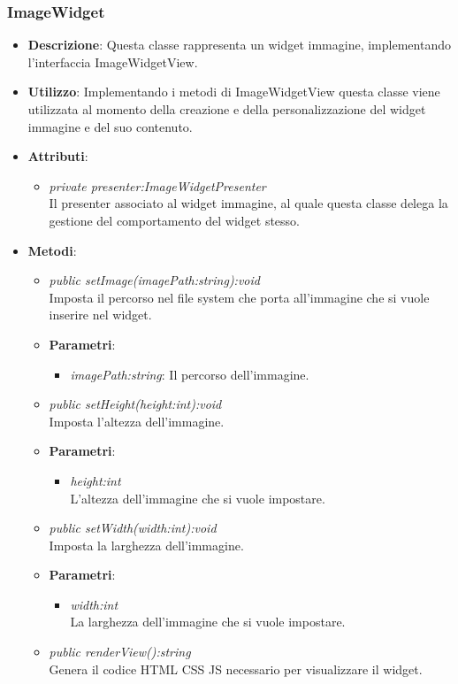 \subsubsection{ImageWidget}
\begin{itemize}
\item \textbf{Descrizione}: Questa classe rappresenta un widget immagine, implementando l'interfaccia ImageWidgetView.
\item \textbf{Utilizzo}: Implementando i metodi di ImageWidgetView questa classe viene utilizzata al momento della creazione e della personalizzazione del widget immagine e del suo contenuto.
\item \textbf{Attributi}:
	\begin{itemize}
	\item \textit{private presenter:ImageWidgetPresenter}\\
	Il presenter associato al widget immagine, al quale questa classe delega la gestione del comportamento del widget stesso.
	\end{itemize}
\item \textbf{Metodi}:
	\begin{itemize}
	\item \textit{public setImage(imagePath:string):void}\\
	Imposta il percorso nel file system che porta all'immagine che si vuole inserire nel widget.
		\item{\textbf{Parametri}: \begin{itemize}
		\item \textit{imagePath:string}: Il percorso dell'immagine.
		\end{itemize}}
	\item \textit{public setHeight(height:int):void}\\
	Imposta l'altezza dell'immagine.
		\item{\textbf{Parametri}: \begin{itemize}
		\item \textit{height:int}\\
		L'altezza dell'immagine che si vuole impostare.
		\end{itemize}}
	\item \textit{public setWidth(width:int):void}\\
	Imposta la larghezza dell'immagine.
		\item{\textbf{Parametri}: \begin{itemize}
		\item \textit{width:int}\\
		La larghezza dell'immagine che si vuole impostare.
		\end{itemize}}
	\item \textit{public renderView():string}\\
	Genera il codice HTML CSS JS necessario per visualizzare il widget.
	\end{itemize}
\end{itemize}

